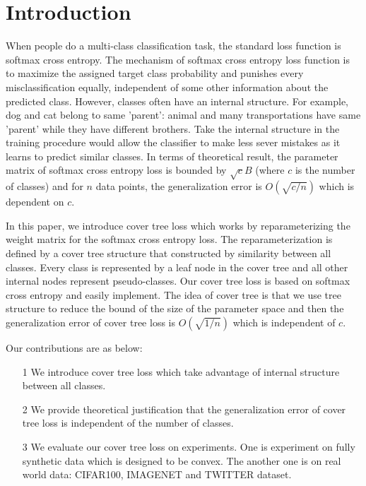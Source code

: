 \documentclass[twoside]{article}
\theoremstyle{definition}
\begin{document}
\section{Introduction}

When people do a multi-class classification task, the standard loss function is softmax cross entropy.
The mechanism of softmax cross entropy loss function is to maximize the assigned target class probability and punishes every misclassification equally, independent of some other information about the predicted class.
However, classes often have an internal structure. 
For example, dog and cat belong to same 'parent': animal and many transportations have same 'parent' while they have different brothers. Take the internal structure in the training procedure would allow the classifier to make less sever mistakes as it learns to predict similar classes.
In terms of theoretical result, the parameter matrix of softmax cross entropy loss is bounded by $\sqrt{c}B$ (where $c$ is the number of classes) and for $n$ data points, the generalization error is $O(\sqrt{c/n})$ which is dependent on $c$.

In this paper, we introduce cover tree loss which works by reparameterizing the weight matrix for the softmax cross entropy loss. 
The reparameterization is defined by a cover tree structure that constructed by similarity between all classes. 
Every class is represented by a leaf node in the cover tree and all other internal nodes represent pseudo-classes. 
Our cover tree loss is based on softmax cross entropy and easily implement.
The idea of cover tree is that we use tree structure to reduce the bound of the size of the parameter space and then the generalization error of cover tree loss is $O(\sqrt{1/n})$ which is independent of $c$.

Our contributions are as below:
\begin{itemize}
    \item [1] 
    We introduce cover tree loss which take advantage of internal structure between all classes.
    \item [2] 
    We provide theoretical justification that the generalization error of cover tree loss is independent of the number of classes.
    \item [3]
    We evaluate our cover tree loss on experiments. One is experiment on fully synthetic data which is designed to be convex. The another one is on real world data: CIFAR100, IMAGENET and TWITTER dataset. 
    
\end{itemize}
\end{document}

